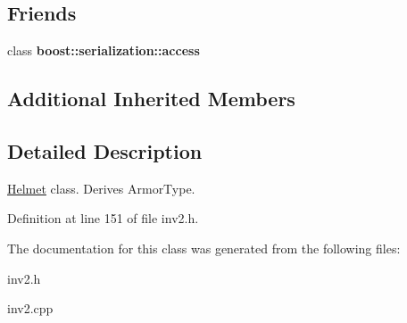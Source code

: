 \subsection*{Friends}
\begin{DoxyCompactItemize}
\item 
\hypertarget{class_helmet_ac98d07dd8f7b70e16ccb9a01abf56b9c}{}\label{class_helmet_ac98d07dd8f7b70e16ccb9a01abf56b9c} 
class {\bfseries boost\+::serialization\+::access}
\end{DoxyCompactItemize}
\subsection*{Additional Inherited Members}


\subsection{Detailed Description}
\hyperlink{class_helmet}{Helmet} class. Derives Armor\+Type. 

Definition at line 151 of file inv2.\+h.



The documentation for this class was generated from the following files\+:\begin{DoxyCompactItemize}
\item 
inv2.\+h\item 
inv2.\+cpp\end{DoxyCompactItemize}
